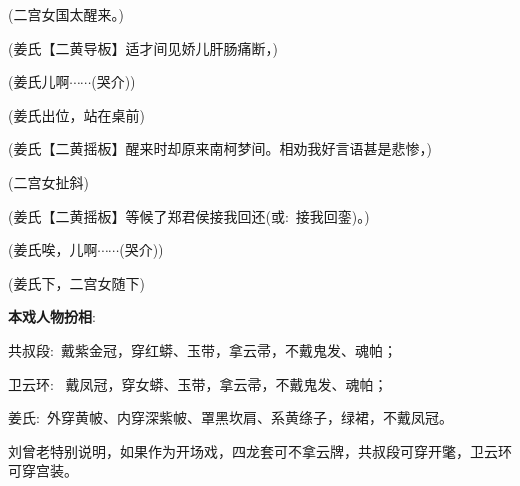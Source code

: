 (二宫女\hspace{15pt}国太醒来。)

(姜氏\hspace{20pt}【{\akai 二黄导板}】适才间见娇儿肝肠痛断，)

(姜氏\hspace{20pt}儿啊$\cdots${}$\cdots{}$({\hwfs 哭介}))

(姜氏{\hwfs 出位}，{\hwfs 站在桌前})

(姜氏\hspace{20pt}【{\akai 二黄摇板}】醒来时却原来南柯梦间。相劝我好言语甚是悲惨，)

({\hwfs 二}宫女{\hwfs 扯斜})

(姜氏\hspace{20pt}【{\akai 二黄摇板}】等候了郑君侯接我回还({\akai 或}:~接我回銮)。)

(姜氏\hspace{20pt}唉，儿啊$\cdots${}$\cdots{}$({\hwfs 哭介}))

(姜氏{\hwfs 下}，{\hwfs 二}宫女{\hwfs 随下})

\vspace{25pt}
{\bfseries\textrm{本戏人物扮相}}:~
\vspace{15pt}

共叔段:~\hspace{20pt}戴紫金冠，穿红蟒、玉带，拿云帚，不戴鬼发、魂帕；

卫云环:~\hspace{20pt} 戴凤冠，穿女蟒、玉带，拿云帚，不戴鬼发、魂帕；

姜氏:~\hspace{30pt}外穿黄帔、内穿深紫帔、罩黑坎肩、系黄绦子，绿裙，不戴凤冠。

\vspace{15pt}
刘曾老特别说明，如果作为开场戏，四龙套可不拿云牌，共叔段可穿开氅，卫云环可穿宫装。

